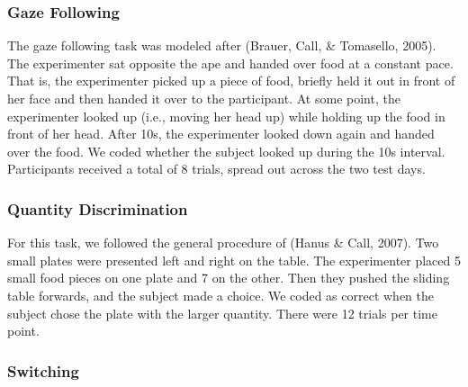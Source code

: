 \documentclass[10pt, letterpaper]{article}
\begin{document}
\hypertarget{gaze-following}{%
\subsubsection{Gaze Following}\label{gaze-following}}

The gaze following task was modeled after (Brauer, Call, \& Tomasello,
2005). The experimenter sat opposite the ape and handed over food at a
constant pace. That is, the experimenter picked up a piece of food,
briefly held it out in front of her face and then handed it over to the
participant. At some point, the experimenter looked up (i.e., moving her
head up) while holding up the food in front of her head. After 10s, the
experimenter looked down again and handed over the food. We coded
whether the subject looked up during the 10s interval. Participants
received a total of 8 trials, spread out across the two test days.

\hypertarget{quantity-discrimination}{%
\subsubsection{Quantity Discrimination}\label{quantity-discrimination}}

For this task, we followed the general procedure of (Hanus \& Call,
2007). Two small plates were presented left and right on the table. The
experimenter placed 5 small food pieces on one plate and 7 on the other.
Then they pushed the sliding table forwards, and the subject made a
choice. We coded as correct when the subject chose the plate with the
larger quantity. There were 12 trials per time point.

\hypertarget{switching}{%
\subsubsection{Switching}\label{switching}}
\end{document}
